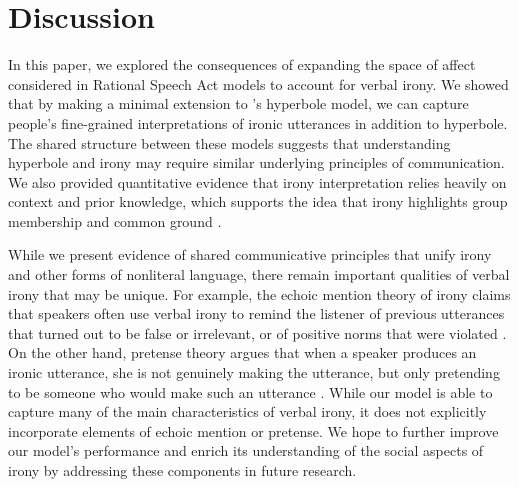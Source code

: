 \documentclass[10pt,letterpaper]{article}
\begin{document}

\section{Discussion}
In this paper, we explored the consequences of expanding the space of affect considered in Rational Speech Act models to account for verbal irony. We showed that by making a minimal extension to 's hyperbole model, we can capture people's fine-grained interpretations of ironic utterances in addition to hyperbole. The shared structure between these models suggests that understanding hyperbole and irony may require similar underlying principles of communication. We also provided quantitative evidence that irony interpretation relies heavily on context and prior knowledge, which supports the idea that irony highlights group membership and common ground \cite{gibbs2000irony}.

While we present evidence of shared communicative principles that unify irony and other forms of nonliteral language, there remain important qualities of verbal irony that may be unique. For example, the echoic mention theory of irony claims that speakers often use verbal irony to remind the listener of previous utterances that turned out to be false or irrelevant, or of positive norms that were violated \cite{sperber1981irony, jorgensen1984test}. On the other hand, pretense theory argues that when a speaker produces an ironic utterance, she is not genuinely making the utterance, but only pretending to be someone who would make such an utterance \cite{clark1984pretense}. 
While our model is able to capture many of the main characteristics of verbal irony, it does not explicitly incorporate elements of echoic mention or pretense. We hope to further improve our model's performance and enrich its understanding of the social aspects of irony by addressing these components in future research. 
\end{document}
